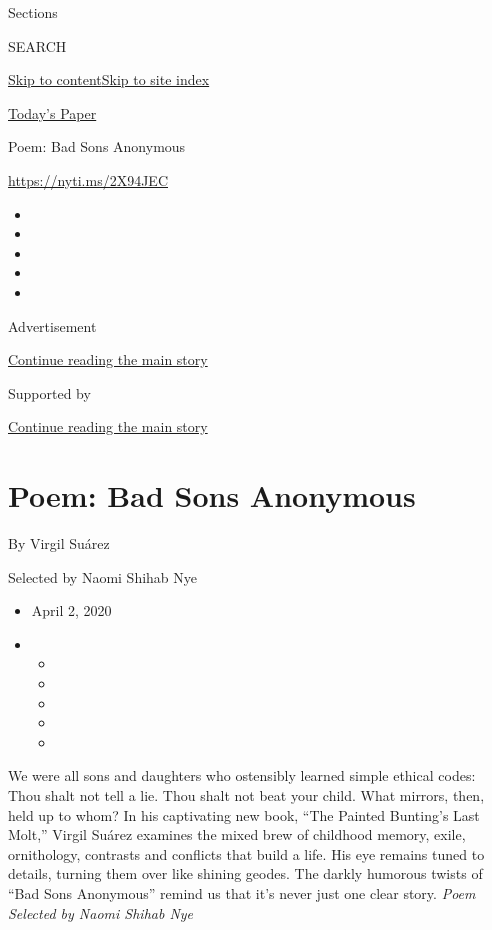 Sections

SEARCH

\protect\hyperlink{site-content}{Skip to
content}\protect\hyperlink{site-index}{Skip to site index}

\href{https://myaccount.nytimes3xbfgragh.onion/auth/login?response_type=cookie\&client_id=vi}{}

\href{https://www.nytimes3xbfgragh.onion/section/todayspaper}{Today's
Paper}

Poem: Bad Sons Anonymous

\url{https://nyti.ms/2X94JEC}

\begin{itemize}
\item
\item
\item
\item
\item
\end{itemize}

Advertisement

\protect\hyperlink{after-top}{Continue reading the main story}

Supported by

\protect\hyperlink{after-sponsor}{Continue reading the main story}

\hypertarget{poem-bad-sons-anonymous}{%
\section{Poem: Bad Sons Anonymous}\label{poem-bad-sons-anonymous}}

By Virgil Suárez

Selected by Naomi Shihab Nye

\begin{itemize}
\item
  April 2, 2020
\item
  \begin{itemize}
  \item
  \item
  \item
  \item
  \item
  \end{itemize}
\end{itemize}

We were all sons and daughters who ostensibly learned simple ethical
codes: Thou shalt not tell a lie. Thou shalt not beat your child. What
mirrors, then, held up to whom? In his captivating new book, ``The
Painted Bunting's Last Molt,'' Virgil Suárez examines the mixed brew of
childhood memory, exile, ornithology, contrasts and conflicts that build
a life. His eye remains tuned to details, turning them over like shining
geodes. The darkly humorous twists of ``Bad Sons Anonymous'' remind us
that it's never just one clear story. \emph{Poem Selected by Naomi
Shihab Nye}

